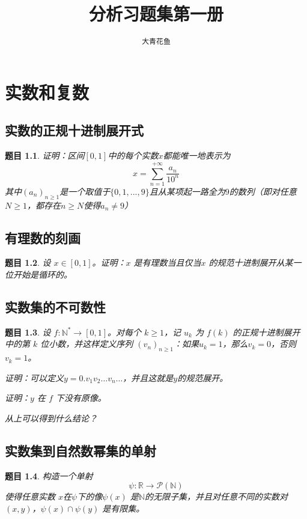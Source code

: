 \documentclass[12pt,UTF8]{ctexbook}
\title{\zihao{0} \bfseries 分析习题集第一册}
\author{\zihao{2} \texttt{大青花鱼}}
\date{}
\theoremstyle{exercisestyle}
\newtheorem*{exercise}{题目}
\theoremstyle{solutionstyle}
\begin{document}
\maketitle
\tableofcontents
\newpage

\chapter{实数和复数}
\section{实数的正规十进制展开式}
\begin{exercise}
证明：区间$[0,1]$中的每个实数$x$都能唯一地表示为
$$x = \sum_{n=1}^{+\infty} \frac{a_n}{10^n}$$
其中$(a_n)_{n \geq 1}$是一个取值于$\{0,1,...,9\}$且从某项起一路全为$9$的数列（即对任意$N \ge 1$，都存在$n \ge N$使得$a_n \ne 9$）
\end{exercise}

\section{有理数的刻画}\label{caractérisation-des-rationnels}
\begin{exercise}
设 $x \in [0,1]$。证明：$x$ 是有理数当且仅当$x$ 的规范十进制展开从某一位开始是循环的。  

\end{exercise}

\section{实数集的不可数性}\label{non-dénombrabilité-de-r}
\begin{exercise}
设 $f: \mathbb{N}^* \to [0,1]$。对每个 $k \geq 1$，记 $u_k$ 为 $f(k)$ 的正规十进制展开中的第 $k$ 位小数，并这样定义序列 $(v_n)_{n\geq 1}$：如果$u_k = 1$，那么$v_k = 0$，否则 $v_k = 1$。
\begin{subquestions}
\item 证明：可以定义$y = 0.v_1 v_2 \ldots v_n \ldots$，并且这就是$y$的规范展开。
\item 证明：$y$ 在 $f$ 下没有原像。
\item 从上可以得到什么结论？
\end{subquestions}
\end{exercise}

\section{实数集到自然数幂集的单射}
\begin{exercise}
构造一个单射
$$
\psi : \mathbb{R} \to \mathcal{P}(\mathbb{N})
$$
使得任意实数 $x$在$\psi$下的像$\psi(x)$ 是$\mathbb{N}$的无限子集，并且对任意不同的实数对 $(x, y)$，$\psi(x) \cap \psi(y)$ 是有限集。

\end{exercise}
\end{document}
